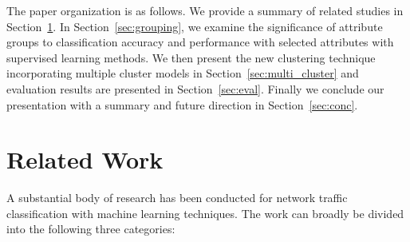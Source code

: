 \documentclass[conference]{IEEEtran}
\begin{document}
The paper organization is as follows. We provide a summary of related studies
in Section~\ref{sec:related}.
In Section~\ref{sec:grouping}, we examine the significance of attribute groups to classification accuracy and performance with selected attributes with supervised learning methods.
We then present the new clustering technique incorporating multiple cluster models in Section~\ref{sec:multi_cluster} and evaluation results are presented in Section~\ref{sec:eval}.
Finally we conclude our presentation with a summary and future direction in Section~\ref{sec:conc}.

\section{Related Work}
\label{sec:related}
%
%

A substantial body of research has been conducted for network traffic classification with machine learning techniques.
The work can broadly be divided into the following three categories:
\end{document}

